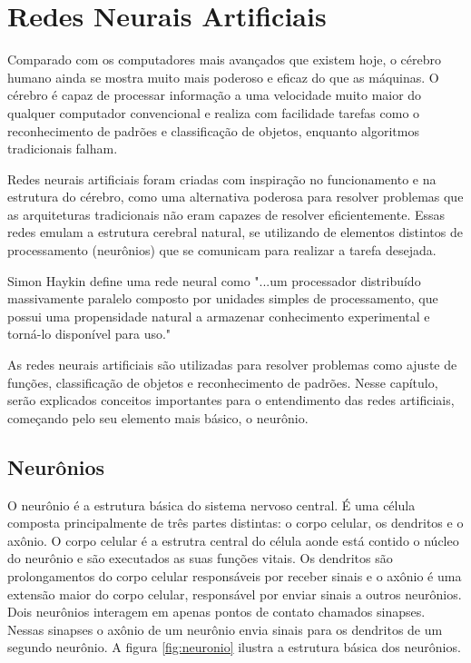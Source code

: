 \chapter{Redes Neurais Artificiais} \label{cap:redes}

Comparado com os computadores mais avançados que existem hoje, o cérebro humano ainda se mostra muito mais poderoso e eficaz do que as máquinas. O cérebro é capaz de processar informação a uma velocidade muito maior do qualquer computador convencional e realiza com facilidade tarefas como o reconhecimento de padrões e classificação de objetos, enquanto algoritmos tradicionais falham. 

Redes neurais artificiais foram criadas com inspiração no funcionamento e na estrutura do cérebro, como uma alternativa poderosa para resolver problemas que as arquiteturas tradicionais não eram capazes de resolver eficientemente. Essas redes emulam a estrutura cerebral natural, se utilizando de elementos distintos de processamento (neurônios) que se comunicam para realizar a tarefa desejada. 

Simon Haykin\cite{Haykin} define uma rede neural como "...um processador distribuído massivamente paralelo composto por unidades simples de processamento, que possui uma propensidade natural a armazenar conhecimento experimental e torná-lo disponível para uso."

As redes neurais artificiais são utilizadas para resolver problemas como ajuste de funções, classificação de objetos e reconhecimento de padrões. Nesse capítulo, serão explicados conceitos importantes para o entendimento das redes artificiais, começando pelo seu elemento mais básico, o neurônio.

\section{Neurônios}

O neurônio é a estrutura básica do sistema nervoso central. É uma célula composta principalmente de três partes distintas: o corpo celular, os dendritos e o axônio. O corpo celular é a estrutra central do célula aonde está contido o núcleo do neurônio e são executados as suas funções vitais. Os dendritos são prolongamentos do corpo celular responsáveis por receber sinais e o axônio é uma extensão maior do corpo celular, responsável por enviar sinais a outros neurônios. Dois neurônios interagem em apenas  pontos de contato chamados sinapses. Nessas sinapses o axônio de um neurônio envia sinais para os dendritos de um segundo neurônio. A figura \ref{fig:neuronio} ilustra a estrutura básica dos neurônios.

